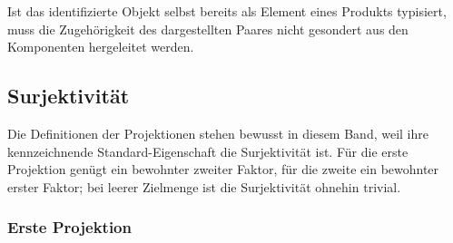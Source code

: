 \documentclass[main.tex]{subfiles}
\begin{document}
Ist das identifizierte Objekt selbst bereits als Element eines Produkts
typisiert, muss die Zugehörigkeit des dargestellten Paares nicht gesondert aus
den Komponenten hergeleitet werden.

\begin{tabproofwide}
\end{tabproofwide}

\begin{tabproofwide}
\end{tabproofwide}

\subsection{Surjektivität}

Die Definitionen der Projektionen stehen bewusst in diesem Band, weil ihre
kennzeichnende Standard-Eigenschaft die Surjektivität ist. Für die erste
Projektion genügt ein bewohnter zweiter Faktor, für die zweite ein bewohnter
erster Faktor; bei leerer Zielmenge ist die Surjektivität ohnehin trivial.

\subsubsection{Erste Projektion}

\begin{tabproof}
\end{tabproof}
\end{document}
